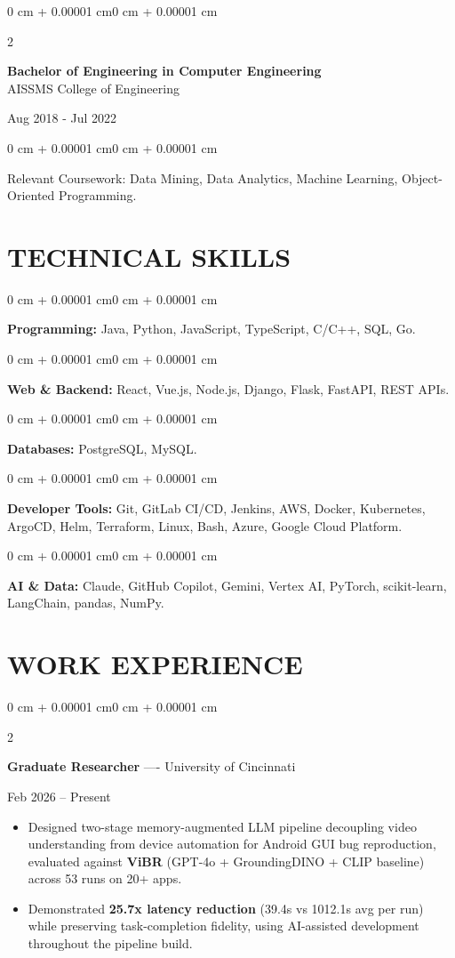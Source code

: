 \documentclass[10pt, letterpaper]{article}
\newenvironment{highlights}{
    \begin{itemize}[
        topsep=0.10 cm,
        parsep=0.06 cm,
        partopsep=0pt,
        itemsep=0.06 cm,
        leftmargin=12pt
    ]
}{
    \end{itemize}
}
\newenvironment{onecolentry}{
    \begin{adjustwidth}{0 cm + 0.00001 cm}{0 cm + 0.00001 cm}
}{
    \end{adjustwidth}
}
\newenvironment{twocolentry}[2][]{
    \onecolentry
    \def\secondColumn{#2}
    \setcolumnwidth{\fill, 4.5 cm}
    \begin{paracol}{2}
}{
    \switchcolumn \raggedleft \secondColumn
    \end{paracol}
    \endonecolentry
}
\begin{document}
\begin{twocolentry}{
    Aug 2018 - Jul 2022
}
    \textbf{Bachelor of Engineering in Computer Engineering} \\
    AISSMS College of Engineering
\end{twocolentry}
\begin{onecolentry}
Relevant Coursework: Data Mining, Data Analytics, Machine Learning, Object-Oriented Programming.
\end{onecolentry}
\section{TECHNICAL SKILLS}
\begin{onecolentry}
\textbf{Programming:} Java, Python, JavaScript, TypeScript, C/C++, SQL, Go.
\end{onecolentry}
\vspace{0.06 cm}
\begin{onecolentry}
\textbf{Web \& Backend:} React, Vue.js, Node.js, Django, Flask, FastAPI, REST APIs.
\end{onecolentry}
\vspace{0.06 cm}
\begin{onecolentry}
\textbf{Databases:} PostgreSQL, MySQL.
\end{onecolentry}
\vspace{0.06 cm}
\begin{onecolentry}
\textbf{Developer Tools:} Git, GitLab CI/CD, Jenkins, AWS, Docker, Kubernetes, ArgoCD, Helm, Terraform, Linux, Bash, Azure, Google Cloud Platform.
\end{onecolentry}
\vspace{0.06 cm}
\begin{onecolentry}
\textbf{AI \& Data:} Claude, GitHub Copilot, Gemini, Vertex AI, PyTorch, scikit-learn, LangChain, pandas, NumPy.
\end{onecolentry}

\section{WORK EXPERIENCE}
\begin{twocolentry}{Feb 2026 -- Present}
\textbf{Graduate Researcher} ---- University of Cincinnati
\end{twocolentry}
\begin{highlights}
  \item Designed two-stage memory-augmented LLM pipeline decoupling video understanding from device automation for Android GUI bug reproduction, evaluated against \textbf{ViBR} (GPT-4o + GroundingDINO + CLIP baseline) across 53 runs on 20+ apps.
  \item Demonstrated \textbf{25.7x latency reduction} (39.4s vs 1012.1s avg per run) while preserving task-completion fidelity, using AI-assisted development throughout the pipeline build.
\end{highlights}
\end{document}
